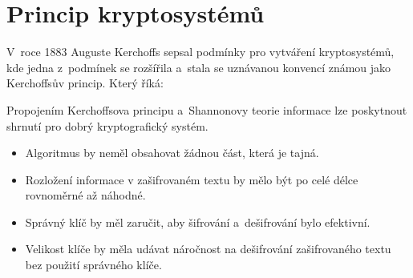 \section{Princip kryptosystémů}
V~roce 1883 Auguste Kerchoffs sepsal podmínky pro vytváření kryptosystémů, kde jedna z~podmínek se rozšířila a~stala se uznávanou konvencí známou jako Kerchoffsův princip. Který říká: \newline\begin{quote}
    \textit{}
\end{quote}
\newpage
Propojením Kerchoffsova principu a~Shannonovy teorie informace lze poskytnout shrnutí pro dobrý kryptografický systém.
\begin{itemize}
    \item Algoritmus by neměl obsahovat žádnou část, která je tajná.
    \item Rozložení informace v zašifrovaném textu by mělo být po celé délce rovnoměrné až náhodné.
    \item Správný klíč by měl zaručit, aby šifrování a~dešifrování bylo efektivní.
    \item Velikost klíče by měla udávat náročnost na dešifrování zašifrovaného textu bez použití správného klíče.\cite{Mao0130669431ISBN}
\end{itemize}

